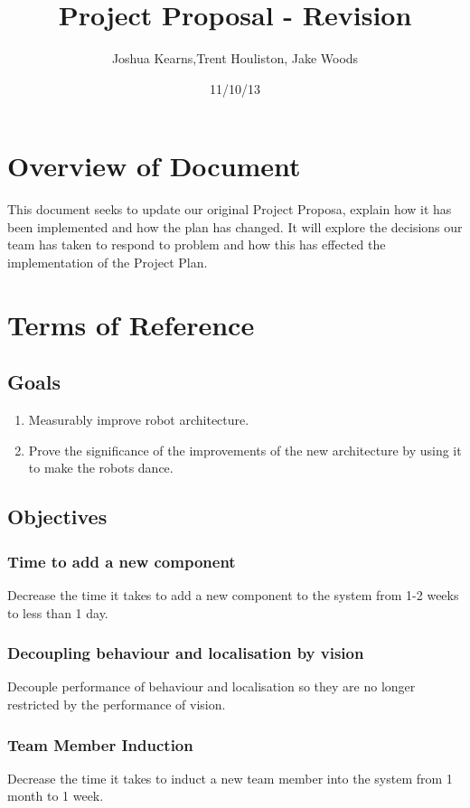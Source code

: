 \documentclass[a4paper]{article}
\title{Project Proposal - Revision}
\author{Joshua Kearns,Trent Houliston, Jake Woods}
\date{11/10/13}
\begin{document}
	\maketitle
	
	\clearpage
	\tableofcontents
	\clearpage

	\section{Overview of Document}
	This document seeks to update our original Project Proposa, explain how it has been implemented and how the plan has changed. It will explore the decisions our team has taken to respond to problem and how this has effected the implementation of the Project Plan.

	\section{Terms of Reference}
		\subsection {Goals}
			\begin{enumerate}
				\item Measurably improve robot architecture.
				\item Prove the significance of the improvements of the new architecture by using it to make the robots dance.
			\end{enumerate}
		\subsection {Objectives}
			\subsubsection{Time to add a new component}
				Decrease the time it takes to add a new component to the system from 1-2 weeks to less than 1 day.
			\subsubsection{Decoupling behaviour and localisation by vision}
				Decouple performance of behaviour and localisation so they are no longer restricted by the performance of vision.
			\subsubsection{Team Member Induction}
				Decrease the time it takes to induct a new team member into the system from 1 month to 1 week.
\end{document}
